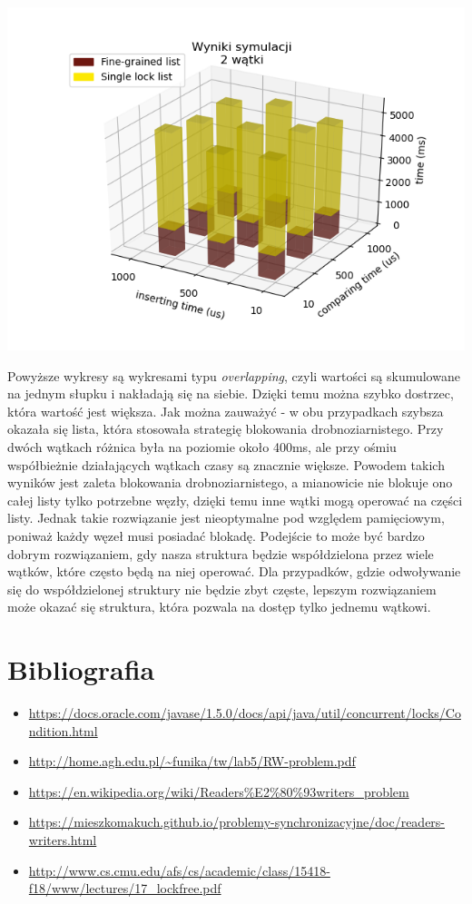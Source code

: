 \documentclass[12pt]{article}
\begin{document}
\begin{center}
\centering
    \includegraphics{chart_results_lists_8_threads.png}
\end{center}


Powyższe wykresy są wykresami typu \emph{overlapping}, czyli wartości są skumulowane na jednym słupku i nakładają się na siebie. Dzięki temu można szybko dostrzec, która wartość jest większa.
Jak można zauważyć - w obu przypadkach szybsza okazała się lista, która stosowała strategię blokowania drobnoziarnistego. Przy dwóch wątkach różnica była na poziomie około 400ms, ale przy ośmiu współbieżnie działających wątkach czasy są znacznie większe.
Powodem takich wyników jest zaleta blokowania drobnoziarnistego, a mianowicie nie blokuje ono całej listy tylko potrzebne węzły, dzięki temu inne wątki mogą operować na części listy. Jednak takie rozwiązanie jest nieoptymalne pod względem pamięciowym, poniważ każdy węzeł musi posiadać blokadę. Podejście to może być bardzo dobrym rozwiązaniem, gdy nasza struktura będzie współdzielona przez wiele wątków, które często będą na niej operować. Dla przypadków, gdzie odwoływanie się do współdzielonej struktury nie będzie zbyt częste, lepszym rozwiązaniem może okazać się struktura, która pozwala na dostęp tylko jednemu wątkowi.

\newpage
\section{Bibliografia}
\begin{itemize}
    \item \url{https://docs.oracle.com/javase/1.5.0/docs/api/java/util/concurrent/locks/Condition.html}
    \item \url{http://home.agh.edu.pl/~funika/tw/lab5/RW-problem.pdf}
    \item \url{https://en.wikipedia.org/wiki/Readers%E2%80%93writers_problem}
    \item \url{https://mieszkomakuch.github.io/problemy-synchronizacyjne/doc/readers-writers.html}
    \item \url{http://www.cs.cmu.edu/afs/cs/academic/class/15418-f18/www/lectures/17_lockfree.pdf}
\end{itemize}
\end{document}
